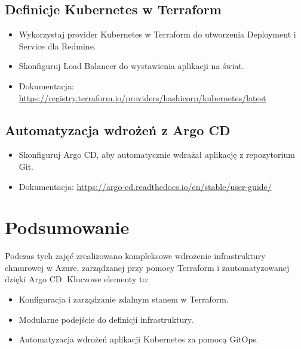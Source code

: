 \documentclass{article}
\begin{document}
\subsection{Definicje Kubernetes w Terraform}
\begin{itemize}
    \item Wykorzystaj provider Kubernetes w Terraform do utworzenia Deployment i Service dla Redmine.
    \item Skonfiguruj Load Balancer do wystawienia aplikacji na świat.
    \item Dokumentacja: \url{https://registry.terraform.io/providers/hashicorp/kubernetes/latest}
\end{itemize}

\subsection{Automatyzacja wdrożeń z Argo CD}
\begin{itemize}
    \item Skonfiguruj Argo CD, aby automatycznie wdrażał aplikację z repozytorium Git.
    \item Dokumentacja: \url{https://argo-cd.readthedocs.io/en/stable/user-guide/}
\end{itemize}

\section{Podsumowanie}
Podczas tych zajęć zrealizowano kompleksowe wdrożenie infrastruktury chmurowej w Azure, zarządzanej przy pomocy Terraform i zautomatyzowanej dzięki Argo CD. Kluczowe elementy to:
\begin{itemize}
    \item Konfiguracja i zarządzanie zdalnym stanem w Terraform.
    \item Modularne podejście do definicji infrastruktury.
    \item Automatyzacja wdrożeń aplikacji Kubernetes za pomocą GitOps.
\end{itemize}
\end{document}
